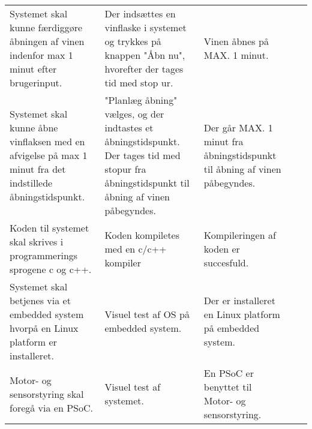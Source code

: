 \begin{longtable}{ p{2cm}  p{2cm}  p{2cm}  p{1.5cm} p{2cm} }
	Systemet skal kunne færdiggøre åbningen af vinen indenfor max 1 minut efter brugerinput.& Der indsættes en vinflaske i systemet og trykkes på knappen "Åbn nu", hvorefter der tages tid med stop ur.& Vinen åbnes på MAX. 1 minut. & &\\
	
	Systemet skal kunne åbne vinflaksen med en afvigelse på max 1 minut fra det indstillede åbningstidspunkt.& "Planlæg åbning" vælges, og der indtastes et åbningstidspunkt. Der tages tid med stopur fra åbningstidspunkt til åbning af vinen påbegyndes.& Der går MAX. 1 minut fra åbningstidspunkt til åbning af vinen påbegyndes. & &\\ 
	  
	Koden til systemet skal skrives i programmerings sprogene c og c++.& Koden kompiletes med en c/c++ kompiler& Kompileringen af koden er succesfuld. & &\\ 
	
	Systemet skal betjenes via et embedded system hvorpå en Linux platform er installeret.& Visuel test af OS på embedded system.& Der er installeret en Linux platform på embedded system. & &\\ 
	
	Motor- og sensorstyring skal foregå via en PSoC.& Visuel test af systemet.& En PSoC er benyttet til Motor- og sensorstyring.& & \\  



\end{longtable}
